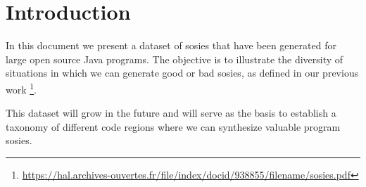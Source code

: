 \section{Introduction}

In this document we present a dataset of sosies that have been generated for large open source Java programs. 
The objective is to illustrate the diversity of situations in which we can generate good or bad sosies, as defined in our previous work \footnote{\url{https://hal.archives-ouvertes.fr/file/index/docid/938855/filename/sosies.pdf}}. 

This dataset will grow in the future and will serve as the basis to establish a taxonomy of different code regions where we can synthesize valuable program sosies. 